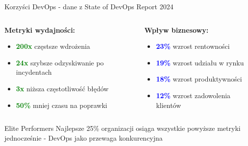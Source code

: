 \documentclass[10pt, aspectratio=169]{beamer}
\begin{document}
\begin{frame}{Korzyści DevOps - dane z State of DevOps Report 2024}
\begin{columns}[T]
\begin{column}{0.5\textwidth}
\textbf{Metryki wydajności:}
\begin{itemize}
\item \textcolor{green}{\textbf{200x}} częstsze wdrożenia
\item \textcolor{green}{\textbf{24x}} szybsze odzyskiwanie po incydentach
\item \textcolor{green}{\textbf{3x}} niższa częstotliwość błędów
\item \textcolor{green}{\textbf{50\%}} mniej czasu na poprawki
\end{itemize}
\end{column}
\begin{column}{0.5\textwidth}
\textbf{Wpływ biznesowy:}
\begin{itemize}
\item \textcolor{blue}{\textbf{23\%}} wzrost rentowności
\item \textcolor{blue}{\textbf{19\%}} wzrost udziału w rynku
\item \textcolor{blue}{\textbf{18\%}} wzrost produktywności
\item \textcolor{blue}{\textbf{12\%}} wzrost zadowolenia klientów
\end{itemize}
\end{column}
\end{columns}

\vspace{1cm}
\begin{alertblock}{Elite Performers}
Najlepsze 25\% organizacji osiąga wszystkie powyższe metryki jednocześnie - DevOps jako przewaga konkurencyjna
\end{alertblock}
\end{frame}
\end{document}
